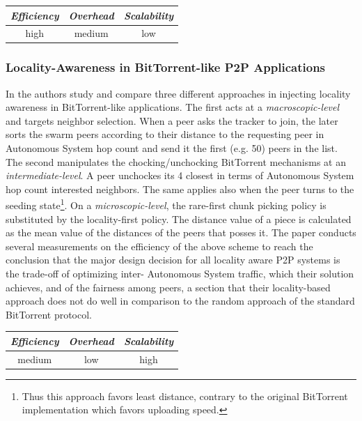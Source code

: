\begin{center}
\begin{tabular}{ccc}
\emph{Efficiency} & \emph{Overhead} & \emph{Scalability} \\
\hline
high &
medium &
low
\end{tabular}
\end{center}

\subsubsection{Locality-Awareness in BitTorrent-like P2P Applications}
In \cite{LCLX2009} the authors study and compare three different
approaches in injecting locality awareness in BitTorrent-like applications. The
first acts at a \emph{macroscopic-level} and targets neighbor selection. When a
peer asks the tracker to join, the later sorts the swarm peers according to
their distance to the requesting peer in Autonomous System hop count and send it
the first
(e.g. 50) peers in the list. The second manipulates the chocking/unchocking
BitTorrent mechanisms at an \emph{intermediate-level}. A peer unchockes its 4
closest in terms of Autonomous System hop count interested neighbors. The same
applies also
when the peer turns to the seeding state\footnote{Thus this approach favors
least distance, contrary to the original BitTorrent implementation which favors
uploading speed.}. On a \emph{microscopic-level}, the rare-first chunk picking
policy is substituted by the locality-first policy. The distance value of a
piece is calculated as the mean value of the distances of the peers that posses
it. The paper conducts several measurements on the efficiency of the above
scheme to reach the conclusion that the major design decision for all locality
aware P2P systems is the trade-off of optimizing inter- Autonomous System
traffic, which their solution achieves, and of the fairness among peers, a
section that their locality-based approach does not do well in comparison to the
random approach of the standard BitTorrent protocol.

\begin{center}
\begin{tabular}{ccc}
\emph{Efficiency} & \emph{Overhead} & \emph{Scalability} \\
\hline
medium &
low &
%
high
\end{tabular}
\end{center}

